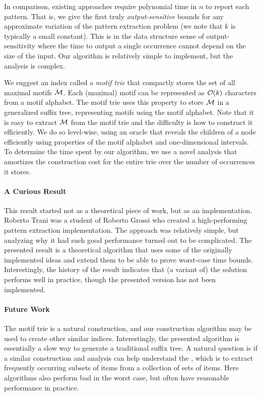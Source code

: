 In comparison, existing approaches %
require polynomial time in $n$ to report each pattern. 
That is, we give the first truly \emph{output-sensitive} bounds for any approximate variation of the pattern extraction problem (we note that $k$ is typically a small constant). This is in the data structure sense of output-sensitivity where the time to output a single occurrence cannot depend on the size of the input.
Our algorithm is relatively simple to implement, but the analysis is complex. 

We suggest an index called a \emph{motif trie} that compactly stores the set of all maximal motifs $\mathcal{M}$. Each (maximal) motif can be represented as $\mathcal{O}(k)$ characters from a motif alphabet. The motif trie uses this property to store $\mathcal{M}$ in a generalized suffix tree, representing motifs using the motif alphabet. 
Note that it is easy to extract $\mathcal{M}$ from the motif trie and the difficulty is how to construct it efficiently. We do so level-wise, using an oracle that reveals the children of a node efficiently using properties of the motif alphabet and one-dimensional intervals. To determine the time spent by our algorithm, we use a novel analysis that amortizes the construction cost for the entire trie over the number of occurrences it stores.


\paragraph{A Curious Result}
This result started not as a theoretical piece of work, but as an implementation. Roberto Trani was a student of Roberto Grossi who created a high-performing pattern extraction implementation. The approach was relatively simple, but analyzing why it had such good performance turned out to be complicated. The presented result is a theoretical algorithm that uses some of the originally implemented ideas and extend them to be able to prove worst-case time bounds. Interestingly, the history of the result indicates that (a variant of) the solution performs well in practice, though the presented version has not been implemented.


\paragraph{Future Work}
The motif trie is a natural construction, and our construction algorithm may be used to create other similar indices. Interestingly, the presented algorithm is essentially a slow way to generate a traditional suffix tree. 
A natural question is if a similar construction and analysis can help understand the , which is to extract frequently occurring subsets of items from a collection of sets of items. Here algorithms also perform bad in the worst case, but often have reasonable performance in practice.


